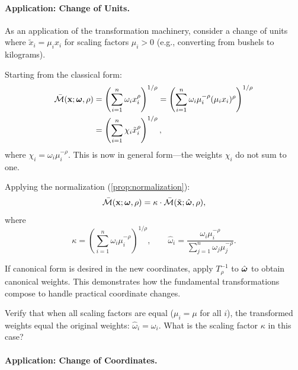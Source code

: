 \paragraph{Application: Change of Units.}

As an application of the transformation machinery, consider a change of units where $\tilde{x}_i = \mu_i x_i$ for scaling factors $\mu_i > 0$ (e.g., converting from bushels to kilograms).

Starting from the classical form:
\begin{align*}
\bar{\mathcal{M}}(\mathbf{x}; \boldsymbol{\omega}, \rho) &= \left( \sum_{i=1}^{n} \omega_i x_i^\rho \right)^{1/\rho} = \left( \sum_{i=1}^{n} \omega_i \mu_i^{-\rho} (\mu_i x_i)^\rho \right)^{1/\rho} \\
&= \left( \sum_{i=1}^{n} \chi_i \tilde{x}_i^\rho \right)^{1/\rho},
\end{align*}
where $\chi_i = \omega_i \mu_i^{-\rho}$. This is now in general form---the weights $\chi_i$ do not sum to one.

Applying the normalization (\cref{prop:normalization}):
\begin{equation}
\bar{\mathcal{M}}(\mathbf{x}; \boldsymbol{\omega}, \rho) = \kappa \cdot \bar{\mathcal{M}}(\tilde{\mathbf{x}}; \hat{\boldsymbol{\omega}}, \rho),
\end{equation}
where
\[
\kappa = \left( \sum_{i=1}^n \omega_i \mu_i^{-\rho} \right)^{1/\rho}, \qquad \hat{\omega}_i = \frac{\omega_i \mu_i^{-\rho}}{\sum_{j=1}^n \omega_j \mu_j^{-\rho}}.
\]

If canonical form is desired in the new coordinates, apply $T_\rho^{-1}$ to $\hat{\boldsymbol{\omega}}$ to obtain canonical weights. This demonstrates how the fundamental transformations compose to handle practical coordinate changes.

\begin{callouttip}[Exercise]
Verify that when all scaling factors are equal ($\mu_i = \mu$ for all $i$), the transformed weights equal the original weights: $\hat{\omega}_i = \omega_i$. What is the scaling factor $\kappa$ in this case?
\end{callouttip}

\paragraph{Application: Change of Coordinates.}

